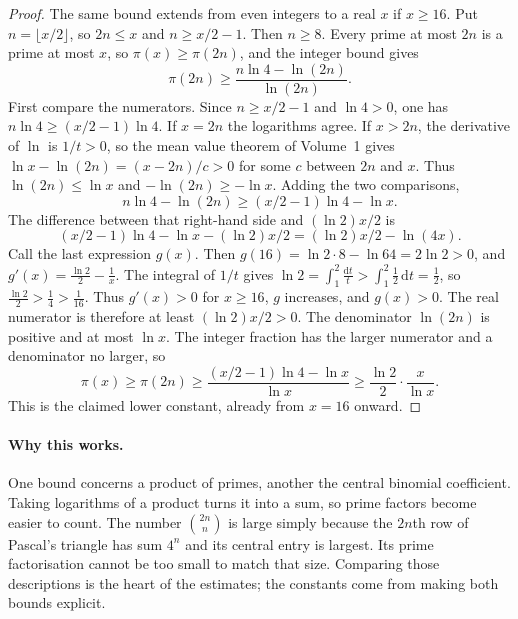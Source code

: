 \begin{proof}
The same bound extends from even integers to a real $x$ if $x\ge16$. Put $n=\lfloor x/2\rfloor$, so $2n\le x$ and $n\ge x/2-1$. Then $n\ge8$. Every prime at most $2n$ is a prime at most $x$, so $\pi(x)\ge\pi(2n)$, and the integer bound gives
\[
\pi(2n)\ge\frac{n\ln4-\ln(2n)}{\ln(2n)}.
\]
First compare the numerators. Since $n\ge x/2-1$ and $\ln4>0$, one has $n\ln4\ge(x/2-1)\ln4$. If $x=2n$ the logarithms agree. If $x>2n$, the derivative of $\ln$ is $1/t>0$, so the mean value theorem of Volume~1 gives $\ln x-\ln(2n)=(x-2n)/c>0$ for some $c$ between $2n$ and $x$. Thus $\ln(2n)\le\ln x$ and $-\ln(2n)\ge-\ln x$. Adding the two comparisons,
\[
n\ln4-\ln(2n)\ge(x/2-1)\ln4-\ln x.
\]
The difference between that right-hand side and $(\ln2)x/2$ is
\[
(x/2-1)\ln4-\ln x-(\ln2)x/2=(\ln2)x/2-\ln(4x).
\]
Call the last expression $g(x)$. Then $g(16)=\ln2\cdot8-\ln64=2\ln2>0$, and $g'(x)=\frac{\ln2}{2}-\frac1x$. The integral of $1/t$ gives $\ln2=\int_1^2\frac{\mathrm dt}t>\int_1^2\frac12\,\mathrm dt=\frac12$, so $\frac{\ln2}{2}>\frac14>\frac1{16}$. Thus $g'(x)>0$ for $x\ge16$, $g$ increases, and $g(x)>0$. The real numerator is therefore at least $(\ln2)x/2>0$. The denominator $\ln(2n)$ is positive and at most $\ln x$. The integer fraction has the larger numerator and a denominator no larger, so
\[
\pi(x)\ge\pi(2n)\ge\frac{(x/2-1)\ln4-\ln x}{\ln x}\ge\frac{\ln2}{2}\cdot\frac x{\ln x}.
\]
This is the claimed lower constant, already from $x=16$ onward.
\end{proof}

\paragraph{Why this works.}
One bound concerns a product of primes, another the central binomial coefficient. Taking logarithms of a product turns it into a sum, so prime factors become easier to count. The number $\binom{2n}{n}$ is large simply because the $2n$th row of Pascal's triangle has sum $4^n$ and its central entry is largest. Its prime factorisation cannot be too small to match that size. Comparing those descriptions is the heart of the estimates; the constants come from making both bounds explicit.


